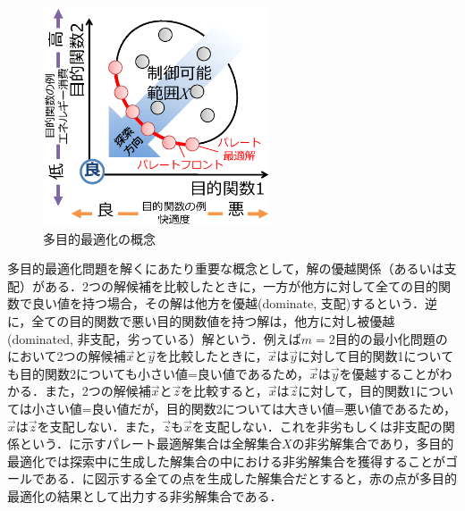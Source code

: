 \begin{figure}[ht]
    \begin{center}
        \includegraphics[width=0.6\textwidth,keepaspectratio=true]{fig/theory_moo.eps}
    \end{center}
    \caption{多目的最適化の概念}
    \label{fig::theory_moo}
\end{figure}

多目的最適化問題を解くにあたり重要な概念として，解の優越関係（あるいは支配）がある．2つの解候補を比較したときに，一方が他方に対して全ての目的関数で良い値を持つ場合，その解は他方を優越(dominate, 支配)するという．逆に，全ての目的関数で悪い目的関数値を持つ解は，他方に対し被優越(dominated, 非支配，劣っている）解という．例えば$m=2$目的の最小化問題のにおいて2つの解候補$\vec{x}$と$\vec{y}$を比較したときに，$\vec{x}$は$\vec{y}$に対して目的関数1についても目的関数2についても小さい値=良い値であるため，$\vec{x}$は$\vec{y}$を優越することがわかる．また，2つの解候補$\vec{x}$と$\vec{z}$を比較すると，$\vec{x}$は$\vec{z}$に対して，目的関数1については小さい値=良い値だが，目的関数2については大きい値=悪い値であるため，$\vec{x}$は$\vec{z}$を支配しない．また，$\vec{z}$も$\vec{x}$を支配しない．これを非劣もしくは非支配の関係という．に示すパレート最適解集合は全解集合$X$の非劣解集合であり，多目的最適化では探索中に生成した解集合の中における非劣解集合を獲得することがゴールである．に図示する全ての点を生成した解集合だとすると，赤の点が多目的最適化の結果として出力する非劣解集合である．

